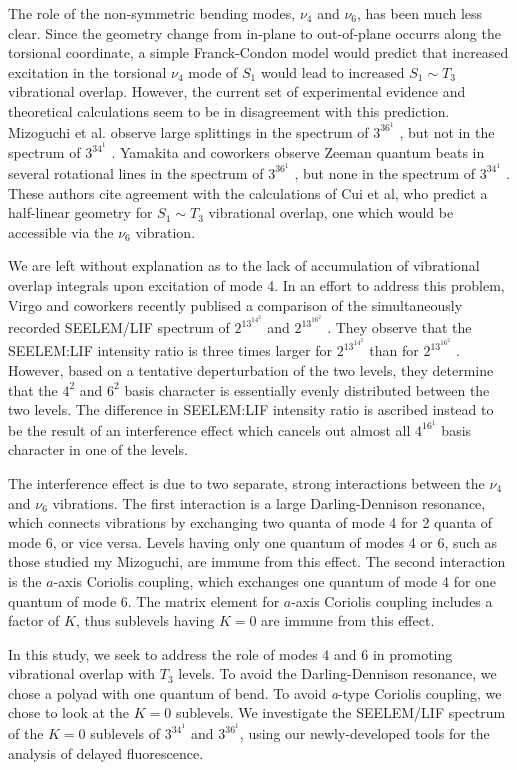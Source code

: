 \documentclass[12pt]{mitthesis}
\begin{document}
The role of the non-symmetric bending modes, $\nu_4$ and $\nu_6$, has
been much less clear.  Since the geometry change from in-plane to
out-of-plane occurrs along the torsional coordinate, a simple
Franck-Condon model would predict that increased excitation in the
torsional $\nu_4$ mode of $S_1$ would lead to increased $S_1 \sim T_3$
vibrational overlap.  However, the current set of experimental
evidence and theoretical calculations seem to be in disagreement with
this prediction.  Mizoguchi et al. observe large splittings in the
spectrum of $3^36^1$ , but not in the spectrum of $3^34^1$
.  Yamakita and coworkers observe Zeeman quantum beats in
several rotational lines in the spectrum of $3^36^1$ , but none
in the spectrum of $3^34^1$ .  These authors cite agreement with
the calculations of Cui et al, who predict a half-linear geometry for $S_1 \sim
T_3$ vibrational overlap, one which would be accessible via the $\nu_6$
vibration.

We are left without explanation as to the lack of accumulation of
vibrational overlap integrals upon excitation of mode 4.  In an effort
to address this problem, Virgo and coworkers recently publised a
comparison of the simultaneously recorded SEELEM/LIF spectrum of
$2^13^14^2$  and $2^13^16^2$ .  They observe that the
SEELEM:LIF intensity ratio is three times larger for $2^13^14^2$
 than for $2^13^16^2$ .  However, based on a tentative
deperturbation of the two levels, they determine that the $4^2$ and
$6^2$ basis character is essentially evenly distributed between the
two levels.  The difference in SEELEM:LIF intensity ratio is ascribed
instead to be the result of an interference effect which cancels out
almost all $4^16^1$ basis character in one of the levels.

The interference effect is due to two separate, strong interactions
between the $\nu_4$ and $\nu_6$ vibrations.  The first interaction is
a large Darling-Dennison resonance, which connects vibrations
by exchanging two quanta of mode 4 for 2 quanta of mode 6, or vice
versa.  Levels having only one quantum of modes 4 or 6, such as those
studied my Mizoguchi, are immune from this effect.  The second
interaction is the $a$-axis Coriolis coupling, which exchanges one
quantum of mode 4 for one quantum of mode 6.  The matrix element for 
$a$-axis Coriolis coupling includes a factor of $K$, thus sublevels
having $K=0$ are immune from this effect.

In this study, we seek to address the role of modes 4 and 6 in
promoting vibrational overlap with $T_3$ levels.  To avoid the
Darling-Dennison resonance, we chose a polyad with one quantum of
bend.  To avoid \emph{a}-type Coriolis coupling, we chose to look at
the $K=0$ sublevels.  We investigate the SEELEM/LIF spectrum of the
$K=0$ sublevels of $3^34^1$ and $3^36^1$, using our newly-developed
tools for the analysis of delayed fluorescence.
\end{document}
